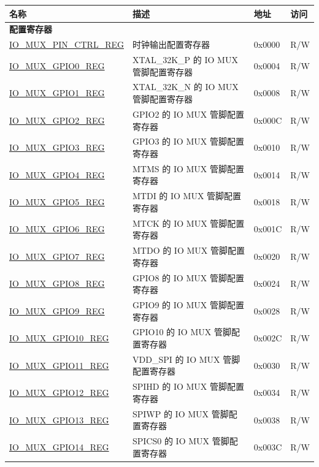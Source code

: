 \begin{longtable}{ | p{6cm} | p{7.2cm} | p{1.3cm} | p{1cm} | }
\hline\rowcolor{lightgray}
名称 & 描述 & 地址 & 访问 \\ \hline
\endhead
\multicolumn{4}{|l|}{\textbf{配置寄存器}} \\ \hline
\hyperref[regdesc:IOMUXPINCTRLREG]{IO\_MUX\_PIN\_CTRL\_REG} & 时钟输出配置寄存器 & 0x0000 & R/W \\ \hline
\hyperref[regdesc:IOMUXGPIONREG]{IO\_MUX\_GPIO0\_REG} & XTAL\_32K\_P 的 IO MUX 管脚配置寄存器 & 0x0004 & R/W \\ \hline
\hyperref[regdesc:IOMUXGPIONREG]{IO\_MUX\_GPIO1\_REG} & XTAL\_32K\_N 的 IO MUX 管脚配置寄存器 & 0x0008 & R/W \\ \hline
\hyperref[regdesc:IOMUXGPIONREG]{IO\_MUX\_GPIO2\_REG} & GPIO2 的 IO MUX 管脚配置寄存器 & 0x000C & R/W \\ \hline
\hyperref[regdesc:IOMUXGPIONREG]{IO\_MUX\_GPIO3\_REG} & GPIO3 的 IO MUX 管脚配置寄存器 & 0x0010 & R/W \\ \hline
\hyperref[regdesc:IOMUXGPIONREG]{IO\_MUX\_GPIO4\_REG} & MTMS 的 IO MUX 管脚配置寄存器 & 0x0014 & R/W \\ \hline
\hyperref[regdesc:IOMUXGPIONREG]{IO\_MUX\_GPIO5\_REG} & MTDI 的 IO MUX 管脚配置寄存器 & 0x0018 & R/W \\ \hline
\hyperref[regdesc:IOMUXGPIONREG]{IO\_MUX\_GPIO6\_REG} & MTCK 的 IO MUX 管脚配置寄存器 & 0x001C & R/W \\ \hline
\hyperref[regdesc:IOMUXGPIONREG]{IO\_MUX\_GPIO7\_REG} & MTDO 的 IO MUX 管脚配置寄存器 & 0x0020 & R/W \\ \hline
\hyperref[regdesc:IOMUXGPIONREG]{IO\_MUX\_GPIO8\_REG} & GPIO8 的 IO MUX 管脚配置寄存器 & 0x0024 & R/W \\ \hline
\hyperref[regdesc:IOMUXGPIONREG]{IO\_MUX\_GPIO9\_REG} & GPIO9 的 IO MUX 管脚配置寄存器 & 0x0028 & R/W \\ \hline
\hyperref[regdesc:IOMUXGPIONREG]{IO\_MUX\_GPIO10\_REG} & GPIO10 的 IO MUX 管脚配置寄存器 & 0x002C & R/W \\ \hline
\hyperref[regdesc:IOMUXGPIONREG]{IO\_MUX\_GPIO11\_REG} & VDD\_SPI 的 IO MUX 管脚配置寄存器 & 0x0030 & R/W \\ \hline
\hyperref[regdesc:IOMUXGPIONREG]{IO\_MUX\_GPIO12\_REG} & SPIHD 的 IO MUX 管脚配置寄存器 & 0x0034 & R/W \\ \hline
\hyperref[regdesc:IOMUXGPIONREG]{IO\_MUX\_GPIO13\_REG} & SPIWP 的 IO MUX 管脚配置寄存器 & 0x0038 & R/W \\ \hline
\hyperref[regdesc:IOMUXGPIONREG]{IO\_MUX\_GPIO14\_REG} & SPICS0 的 IO MUX 管脚配置寄存器 & 0x003C & R/W \\ \hline

\end{longtable}
